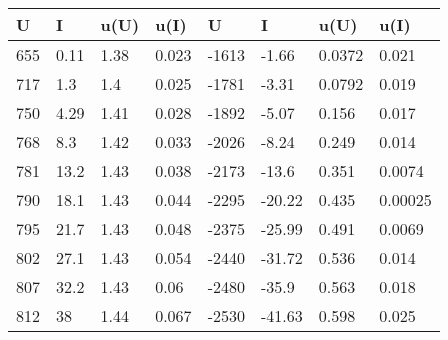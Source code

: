 \begin{table}[H]\centering 
 \begin{tabular}{|l|l|l|l|l|l|l|l|}
\hline
 \rowcolor{lightgray} 
  U  &  I   &  u(U)  &  u(I)  &   U   &   I    &  u(U)  &  u(I)   \\ \hline

 655 & 0.11 &  1.38  & 0.023  & -1613 & -1.66  & 0.0372 &  0.021  \\ \hline
 717 & 1.3  &  1.4   & 0.025  & -1781 & -3.31  & 0.0792 &  0.019  \\ \hline
 750 & 4.29 &  1.41  & 0.028  & -1892 & -5.07  & 0.156  &  0.017  \\ \hline
 768 & 8.3  &  1.42  & 0.033  & -2026 & -8.24  & 0.249  &  0.014  \\ \hline
 781 & 13.2 &  1.43  & 0.038  & -2173 & -13.6  & 0.351  & 0.0074  \\ \hline
 790 & 18.1 &  1.43  & 0.044  & -2295 & -20.22 & 0.435  & 0.00025 \\ \hline
 795 & 21.7 &  1.43  & 0.048  & -2375 & -25.99 & 0.491  & 0.0069  \\ \hline
 802 & 27.1 &  1.43  & 0.054  & -2440 & -31.72 & 0.536  &  0.014  \\ \hline
 807 & 32.2 &  1.43  &  0.06  & -2480 & -35.9  & 0.563  &  0.018  \\ \hline
 812 &  38  &  1.44  & 0.067  & -2530 & -41.63 & 0.598  &  0.025  \\ \hline

\end{tabular}
\end{table}